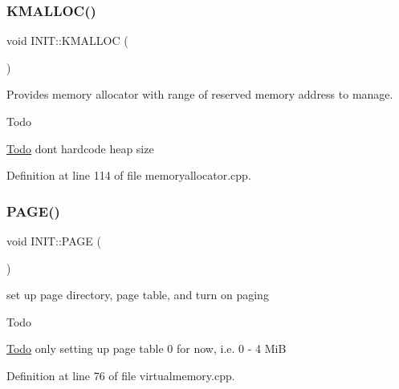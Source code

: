 \mbox{\label{namespace_i_n_i_t_ac811302ce0948a6a097b445b811f9c14}} 
\subsubsection{\texorpdfstring{K\+M\+A\+L\+L\+O\+C()}{KMALLOC()}}
{\footnotesize\ttfamily void I\+N\+I\+T\+::\+K\+M\+A\+L\+L\+OC (\begin{DoxyParamCaption}{ }\end{DoxyParamCaption})}



Provides memory allocator with range of reserved memory address to manage. 

\begin{DoxyRefDesc}{Todo}
\item[\hyperlink{todo__todo000002}{Todo}]don\textquotesingle{}t hardcode heap size \end{DoxyRefDesc}


Definition at line 114 of file memoryallocator.\+cpp.

\mbox{\label{namespace_i_n_i_t_aea383d3de30095cf9d176fa60b66d01d}} 
\subsubsection{\texorpdfstring{P\+A\+G\+E()}{PAGE()}}
{\footnotesize\ttfamily void I\+N\+I\+T\+::\+P\+A\+GE (\begin{DoxyParamCaption}{ }\end{DoxyParamCaption})}



set up page directory, page table, and turn on paging 

\begin{DoxyRefDesc}{Todo}
\item[\hyperlink{todo__todo000003}{Todo}]only setting up page table 0 for now, i.\+e. 0 -\/ 4 MiB \end{DoxyRefDesc}


Definition at line 76 of file virtualmemory.\+cpp.

\mbox{\label{namespace_i_n_i_t_a9e427aa89bec95f574ad21b5e7d9ee8c}} 
